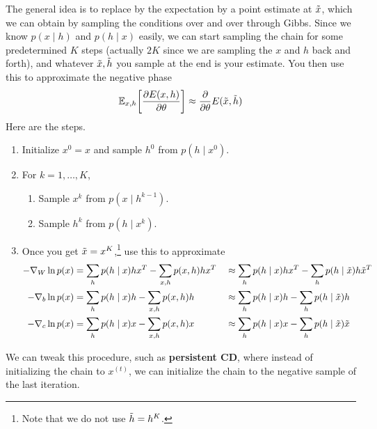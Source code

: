 \documentclass{article}
\begin{document}
    \begin{algo} 
      The general idea is to replace by the expectation by a point estimate at $\Tilde{x}$, which we can obtain by sampling the conditions over and over through Gibbs. Since we know $p(x\mid h)$ and $p(h \mid x)$ easily, we can start sampling the chain for some predetermined $K$ steps (actually $2K$ since we are sampling the $x$ and $h$ back and forth), and whatever $\Tilde{x}, \Tilde{h}$ you sample at the end is your estimate. You then use this to approximate the negative phase 
      \begin{equation}
        \mathbb{E}_{x, h} \bigg[ \frac{\partial E(x, h)}{\partial \theta} \bigg] \approx \frac{\partial}{\partial \theta} E(\Tilde{x}, \Tilde{h})
      \end{equation}
      Here are the steps. 
      \begin{enumerate}
        \item Initialize $x^0 = x$ and sample $h^0$ from $p(h \mid x^0)$. 
        \item For $k = 1, \ldots, K$, 
        \begin{enumerate}
          \item Sample $x^k$ from $p(x \mid h^{k-1})$. 
          \item Sample $h^k$ from $p(h \mid x^k)$. 
        \end{enumerate}
        \item Once you get $\Tilde{x} = x^K$,\footnote{Note that we do not use $\Tilde{h} = h^K$.} use this to approximate 
        \begin{align}
          - \nabla_W \ln{p(x)} & = \sum_h p(h \mid x) h x^T - \sum_{x, h} p(x, h) h x^T && \approx \sum_h p(h \mid x) h x^T - \sum_h p(h \mid \Tilde{x}) h \Tilde{x}^T \\
          - \nabla_b \ln{p(x)} & =  \sum_h p(h \mid x) h - \sum_{x, h} p(x, h) h && \approx \sum_h p(h \mid x) h - \sum_h p(h \mid \Tilde{x}) h \\
          - \nabla_c \ln{p(x)} & =  \sum_h p(h \mid x) x - \sum_{x, h} p(x, h) x && \approx \sum_h p(h \mid x) x - \sum_h p(h \mid \Tilde{x}) \Tilde{x}
        \end{align}
      \end{enumerate}

      We can tweak this procedure, such as \textbf{persistent CD}, where instead of initializing the chain to $x^{(t)}$, we can initialize the chain to the negative sample of the last iteration. 


\end{algo}
\end{document}
